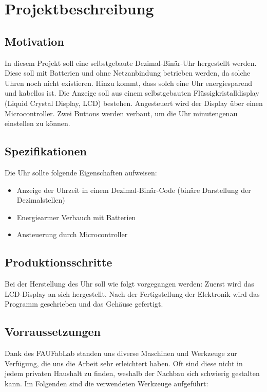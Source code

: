 \section{Projektbeschreibung}
\subsection{Motivation}
In diesem Projekt soll eine selbstgebaute Dezimal-Binär-Uhr hergestellt werden. Diese soll mit Batterien und ohne Netzanbindung betrieben werden, da solche Uhren noch nicht existieren. Hinzu kommt, dass solch eine Uhr energiesparend und kabellos ist. Die Anzeige soll aus einem selbstgebauten Flüssigkristalldisplay (Liquid Crystal Display, LCD) bestehen. Angesteuert wird der Display über einen Microcontroller. Zwei Buttons werden verbaut, um die Uhr minutengenau einstellen zu können.

\subsection{Spezifikationen}
Die Uhr sollte folgende Eigenschaften aufweisen:
\begin{itemize}
\item Anzeige der Uhrzeit in einem Dezimal-Binär-Code (binäre Darstellung der Dezimalstellen)
\item Energiearmer Verbauch mit Batterien
\item Ansteuerung durch Microcontroller
\end{itemize}

\subsection{Produktionsschritte}

Bei der Herstellung des Uhr soll wie folgt vorgegangen werden: Zuerst wird das LCD-Display an sich hergestellt. Nach der Fertigstellung der Elektronik wird das Programm geschrieben und das Gehäuse gefertigt. 

\subsection{Vorraussetzungen}

Dank des FAUFabLab standen uns diverse Maschinen und Werkzeuge zur Verfügung, die uns die Arbeit sehr erleichtert haben. Oft sind diese nicht in jedem privaten Haushalt zu finden, weshalb der Nachbau sich schwierig gestalten kann.
Im Folgenden sind die verwendeten Werkzeuge aufgeführt:\\

